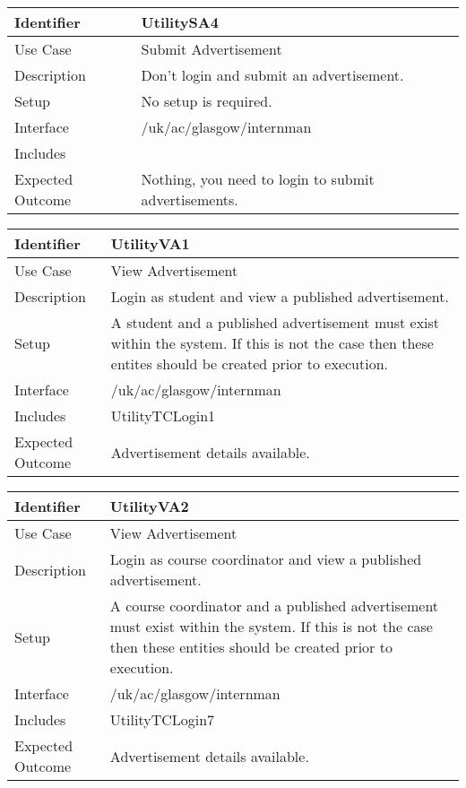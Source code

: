 \vspace{2em}

\begin{tabularx}{\textwidth}{|T|L|}
\hline
Identifier & UtilitySA4\\
\hline
Use Case & Submit Advertisement \\
\hline
Description & Don't login and submit an advertisement.\\
\hline
Setup & No setup is required. \\
\hline
Interface & /uk/ac/glasgow/internman \\
\hline
Includes & \\
\hline
Expected Outcome & Nothing, you need to login to submit advertisements.\\
\hline
\end{tabularx}

\begin{tabularx}{\textwidth}{|T|L|}
\hline
Identifier & UtilityVA1\\
\hline
Use Case & View Advertisement \\
\hline
Description & Login as student and view a published advertisement.\\
\hline
Setup & A student and a published advertisement must exist within the
system. If this is not the case then these entites should be created
prior to execution.\\
\hline
Interface & /uk/ac/glasgow/internman \\
\hline
Includes & UtilityTCLogin1 \\
\hline
Expected Outcome & Advertisement details available.\\
\hline
\end{tabularx}

\vspace{2em}

\begin{tabularx}{\textwidth}{|T|L|}
\hline
Identifier & UtilityVA2\\
\hline
Use Case & View Advertisement \\
\hline
Description & Login as course coordinator and view a published advertisement.\\
\hline
Setup & A course coordinator and a published advertisement must exist
within the system. If this is not the case then these entities should
be created prior to execution.\\
\hline
Interface & /uk/ac/glasgow/internman \\
\hline
Includes & UtilityTCLogin7\\
\hline
Expected Outcome & Advertisement details available.\\
\hline
\end{tabularx}

